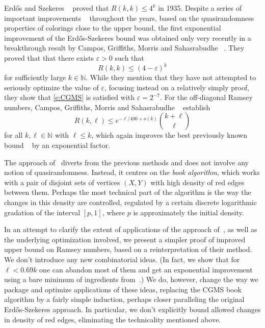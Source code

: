 \documentclass[reqno,final,12pt]{amsart}
\newcommand{\eps}{\varepsilon}
\begin{document}
Erd\H{o}s and Szekeres ~\cite{ES35} proved that $R(k,k) \leq 4^k$ in 1935. Despite a series of important improvements ~\cite{C09,S20,T88} throughout the years, based on the quasirandomness properties of colorings close to the upper bound, the first exponential improvement of the Erd\H{o}s-Szekeres bound was obtained only very recently in a breakthrough result by Campos, Griffiths, Morris and Sahasrabudhe ~\cite{CGMS23}.
They proved that that there exists $\eps > 0$ such that 
\begin{equation}\label{e:CGMS}
R(k,k) \leq (4-\eps)^k
\end{equation} for sufficiently large $k \in \mathbb{N}$. While they mention that they have not attempted to seriously optimize  the value of $\eps$, focusing instead on a relatively simply proof, they show that \eqref{e:CGMS} is satisfied with $\eps = 2^{-7}$.   For the off-diagonal Ramsey numbers, Campos, Griffiths, Morris and Sahasrabudhe ~\cite{CGMS23} establish
\begin{equation}\label{e:CGMS2}
R(k, \ell) \leq e^{-\ell/400 + o(k)}\binom{k + \ell}{\ell}
\end{equation} for all $k, \ell \in \mathbb{N}$ with $\ell \leq k$, which again improves the best previously  known bound ~\cite{S20} by an exponential factor. 

The approach of~\cite{CGMS23} diverts from the previous methods and does not involve any notion of quasirandomness. Instead, it centres on the \emph{book algorithm}, which works with a pair of disjoint sets of vertices $(X,Y)$ with high density of red edges between them. Perhaps the most technical part of the algorithm is the way the changes in this density are controlled, regulated by a certain discrete logarithmic gradation of the interval $[p,1]$, where $p$ is approximately the initial density.

In an attempt to clarify the extent of applications of the approach of~\cite{CGMS23}, as well as the underlying optimization involved, we present a simpler proof of improved upper bound on Ramsey numbers, based on a reinterpretation of their method. We don't introduce any new combinatorial ideas. (In fact, we show that for $\ell < 0.69k$ one can abandon most of them and get an exponential improvement using a bare minimum of ingredients from~\cite{CGMS23}.) We do, however, change the way we package and optimize applications of these ideas, replacing the CGMS book algorithm by a fairly simple induction, perhaps  closer paralleling the original Erd\H{o}s-Szekeres approach. In particular, we don't explicitly bound allowed changes in density of red edges, eliminating the technicality mentioned above.   
\end{document}
